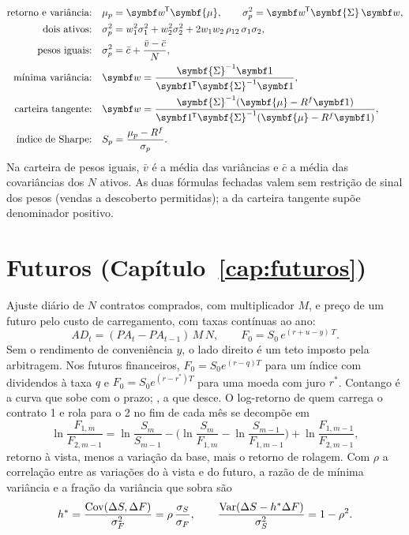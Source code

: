 \begin{align*}
\text{retorno e variância:}\quad & \mu_p = \vetor{w}\T\symbf{\mu} , \qquad \sigma_p^2 = \vetor{w}\T\symbf{\Sigma}\,\vetor{w} , \\
\text{dois ativos:}\quad & \sigma_p^2 = w_1^2\sigma_1^2 + w_2^2\sigma_2^2 + 2 w_1 w_2\,\rho_{12}\,\sigma_1\sigma_2 , \\
\text{pesos iguais:}\quad & \sigma_p^2 = \bar c + \frac{\bar v - \bar c}{N} , \\
\text{mínima variância:}\quad & \vetor{w} = \frac{\symbf{\Sigma}^{-1}\vetor{1}}{\vetor{1}\T\symbf{\Sigma}^{-1}\vetor{1}} , \\
\text{carteira tangente:}\quad & \vetor{w} = \frac{\symbf{\Sigma}^{-1}(\symbf{\mu} - R^f\vetor{1})}{\vetor{1}\T\symbf{\Sigma}^{-1}(\symbf{\mu} - R^f\vetor{1})} , \\
\text{índice de Sharpe:}\quad & S_p = \frac{\mu_p - R^f}{\sigma_p} .
\end{align*}
Na carteira de pesos iguais, $\bar v$ é a média das variâncias e $\bar c$ a média das covariâncias dos $N$ ativos. As duas fórmulas fechadas valem sem restrição de sinal dos pesos (vendas a descoberto permitidas); a da carteira tangente supõe denominador positivo.

\section{Futuros (Capítulo~\ref{cap:futuros})}

Ajuste diário de $N$ contratos comprados, com multiplicador $M$, e preço de um futuro pelo custo de carregamento, com taxas contínuas ao ano:
\begin{equation*}
AD_t = (PA_t - PA_{t-1})\, M\, N , \qquad F_0 = S_0\, e^{(r + u - y)\,T} .
\end{equation*}
Sem o rendimento de conveniência $y$, o lado direito é um teto imposto pela arbitragem. Nos futuros financeiros, $F_0 = S_0 e^{(r-q)T}$ para um índice com dividendos à taxa $q$ e $F_0 = S_0 e^{(r-r^{*})T}$ para uma moeda com juro $r^{*}$. Contango é a curva que sobe com o prazo; , a que desce. O log-retorno de quem carrega o contrato 1 e rola para o 2 no fim de cada mês se decompõe em
\begin{equation*}
\ln\frac{F_{1,m}}{F_{2,m-1}} = \ln\frac{S_m}{S_{m-1}} - \Big(\ln\frac{S_m}{F_{1,m}} - \ln\frac{S_{m-1}}{F_{1,m-1}}\Big) + \ln\frac{F_{1,m-1}}{F_{2,m-1}} ,
\end{equation*}
retorno à vista, menos a variação da base, mais o retorno de rolagem. Com $\rho$ a correlação entre as variações do à vista e do futuro, a razão de  de mínima variância e a fração da variância que sobra são
\begin{equation*}
h^{\ast} = \frac{\operatorname{Cov}(\Delta S, \Delta F)}{\sigma_F^2} = \rho\,\frac{\sigma_S}{\sigma_F} , \qquad
\frac{\operatorname{Var}(\Delta S - h^{\ast}\Delta F)}{\sigma_S^2} = 1 - \rho^2 .
\end{equation*}

